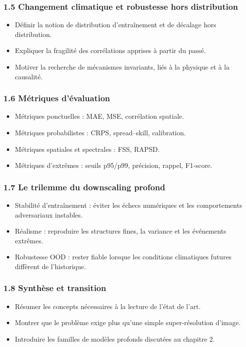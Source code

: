 \documentclass[12pt,a4paper]{article}
\begin{document}
\subsubsection*{1.5 Changement climatique et robustesse hors distribution}
\begin{itemize}
    \item D\'efinir la notion de distribution d'entra\^inement et de d\'ecalage hors distribution.
    \item Expliquer la fragilit\'e des corr\'elations apprises \`a partir du pass\'e.
    \item Motiver la recherche de m\'ecanismes invariants, li\'es \`a la physique et \`a la causalit\'e.
\end{itemize}

\subsubsection*{1.6 M\'etriques d'\'evaluation}
\begin{itemize}
    \item M\'etriques ponctuelles : MAE, MSE, corr\'elation spatiale.
    \item M\'etriques probabilistes : CRPS, spread--skill, calibration.
    \item M\'etriques spatiales et spectrales : FSS, RAPSD.
    \item M\'etriques d'extr\^emes : seuils p95/p99, pr\'ecision, rappel, F1-score.
\end{itemize}

\subsubsection*{1.7 Le trilemme du downscaling profond}
\begin{itemize}
    \item Stabilit\'e d'entra\^inement : \'eviter les \'echecs num\'eriques et les comportements adversariaux instables.
    \item R\'ealisme : reproduire les structures fines, la variance et les \'ev\'enements extr\^emes.
    \item Robustesse OOD : rester fiable lorsque les conditions climatiques futures diff\`erent de l'historique.
\end{itemize}

\subsubsection*{1.8 Synth\`ese et transition}
\begin{itemize}
    \item R\'esumer les concepts n\'ecessaires \`a la lecture de l'\'etat de l'art.
    \item Montrer que le probl\`eme exige plus qu'une simple super-r\'esolution d'image.
    \item Introduire les familles de mod\`eles profonds discut\'ees au chapitre 2.
\end{itemize}
\end{document}
